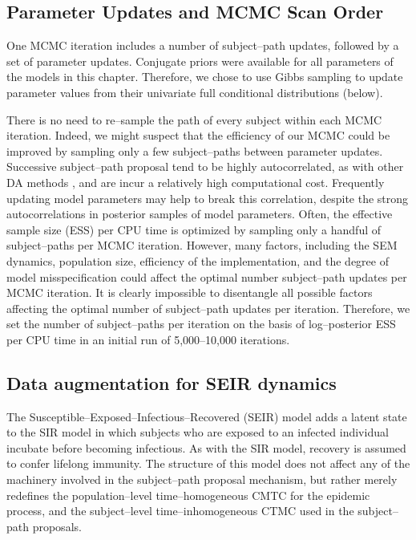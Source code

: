 \subsection{Parameter Updates and MCMC Scan Order}
\label{subsec:bda_mcmc_scan}
One MCMC iteration includes a number of subject--path updates, followed by a set of parameter updates. Conjugate priors were available for all parameters of the models in this chapter. Therefore, we chose to use Gibbs sampling to update parameter values from their univariate full conditional distributions (below).

There is no need to re--sample the path of every subject within each MCMC iteration. Indeed, we might suspect that the efficiency of our MCMC could be improved by sampling only a few subject--paths between parameter updates. Successive subject--path proposal tend to be highly autocorrelated, as with other DA methods \cite{roberts2001}, and are incur a relatively high computational cost. Frequently updating model parameters may help to break this correlation, despite the strong autocorrelations in posterior samples of model parameters. Often, the effective sample size (ESS) per CPU time is optimized by sampling only a handful of subject--paths per MCMC iteration. However, many factors, including the SEM dynamics, population size, efficiency of the implementation, and the degree of model misspecification could affect the optimal number subject--path updates per MCMC iteration. It is clearly impossible to disentangle all possible factors affecting the optimal number of subject--path updates per iteration. Therefore, we set the number of subject--paths per iteration on the basis of log--posterior ESS per CPU time in an initial run of 5,000--10,000 iterations.

\subsection{Data augmentation for SEIR dynamics}
\label{subsec:bda_seir_model}

The Susceptible--Exposed--Infectious--Recovered (SEIR) model adds a latent state to the SIR model in which subjects who are exposed to an infected individual incubate before becoming infectious. As with the SIR model, recovery is assumed to confer lifelong immunity. The structure of this model does not affect any of the machinery involved in the subject--path proposal mechanism, but rather merely redefines the population--level time--homogeneous CMTC for the epidemic process, and the subject--level time--inhomogeneous CTMC used in the subject--path proposals.

